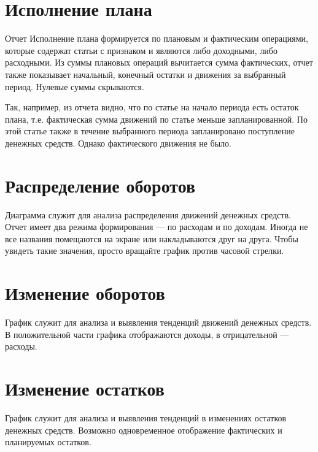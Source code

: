 \documentclass[a4paper,10pt,russian]{sphinxmanual}
\begin{document}
\section{Исполнение плана}
\label{\detokenize{reports:id8}}
Отчет Исполнение плана формируется по плановым и фактическим операциями, которые содержат статьи с
признаком  и являются либо доходными, либо расходными. Из суммы плановых операций вычитается
сумма фактических, отчет также показывает начальный, конечный остатки и движения за выбранный период.
Нулевые суммы скрываются.

Так, например, из отчета видно, что по статье  на начало периода есть остаток плана, т.е. фактическая сумма
движений по статье  меньше запланированной. По этой статье также в течение выбранного периода запланировано
поступление денежных средств. Однако фактического движения не было.

\noindent{}
\noindent{}
\noindent{}


\section{Распределение оборотов}
\label{\detokenize{reports:id9}}
Диаграмма служит для анализа распределения движений денежных средств. Отчет имеет два режима формирования —
по расходам и по доходам. Иногда не все названия помещаются на экране или накладываются друг на друга. Чтобы
увидеть такие значения, просто вращайте график против часовой стрелки.


\section{Изменение оборотов}
\label{\detokenize{reports:id10}}
График служит для анализа и выявления тенденций движений денежных средств. В положительной части графика отображаются доходы,
в отрицательной — расходы.


\section{Изменение остатков}
\label{\detokenize{reports:id11}}
График служит для анализа и выявления тенденций в изменениях остатков денежных средств. Возможно одновременное отображение
фактических и планируемых остатков.
\end{document}
